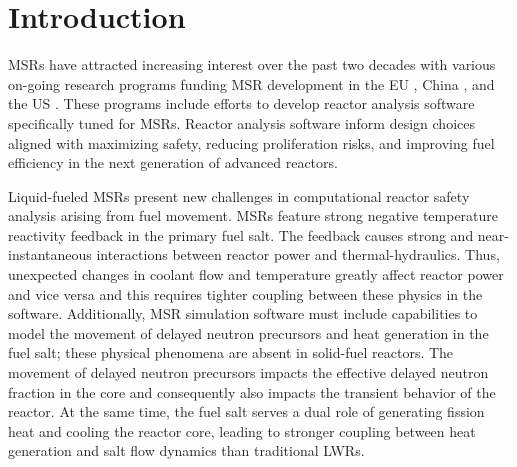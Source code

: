 \section{Introduction} \label{sec:intro}

\glspl{MSR} have attracted increasing interest over the past two
decades with various on-going research programs funding \gls{MSR} development
in the EU \cite{cordis_severe_nodate}, China \cite{dai_17_2017}, and the US
\cite{doe_office_2021}. These programs include efforts to develop
reactor analysis software specifically tuned for \glspl{MSR}. Reactor
analysis software inform design choices aligned with
maximizing safety, reducing proliferation risks, and improving fuel
efficiency in the next generation of advanced reactors.

Liquid-fueled \glspl{MSR} present new challenges in computational reactor
safety analysis arising from fuel movement. \glspl{MSR} feature strong
negative temperature reactivity feedback in the primary fuel salt. The feedback
causes strong and near-instantaneous
interactions between reactor power and thermal-hydraulics. Thus,
unexpected changes in coolant flow and temperature greatly affect reactor
power and vice versa and this requires tighter coupling between these physics
in the software. Additionally, \gls{MSR} simulation software must include
capabilities to model the movement of delayed neutron precursors
and heat generation in the fuel salt; these physical phenomena are
absent in solid-fuel reactors. The movement of delayed neutron precursors
impacts the effective delayed neutron fraction in the core and consequently
also impacts the transient behavior of the reactor. At the same time, the fuel
salt serves a dual role of generating fission heat and cooling the reactor
core, leading to stronger coupling between heat generation and salt flow
dynamics than traditional \glspl{LWR}.

